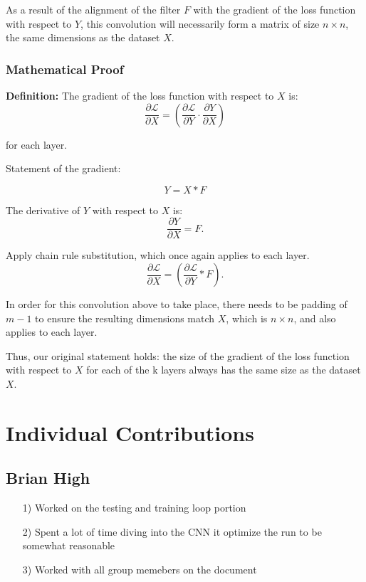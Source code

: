 \documentclass{article}
\begin{document}
As a result of the alignment of the filter \( F \) with the gradient of the loss function with respect to \( Y \), this convolution will necessarily form a matrix of size \( n \times n \), the same dimensions as the dataset \( X \).

\subsubsection*{Mathematical Proof}

\textbf{Definition:} The gradient of the loss function with respect to \( X \) is:
\[
\frac{\partial \mathcal{L}}{\partial X} = \left( \frac{\partial \mathcal{L}}{\partial Y} \cdot \frac{\partial Y}{\partial X} \right)
\]

for each layer.

Statement of the gradient:

\[
Y = X \ast F
\]

The derivative of \( Y \) with respect to \( X \) is:
\[
\frac{\partial Y}{\partial X} = F.
\]

Apply chain rule substitution, which once again applies to each layer.
\[
\frac{\partial \mathcal{L}}{\partial X} = \left( \frac{\partial \mathcal{L}}{\partial Y} \ast F \right).
\]

In order for this convolution above to take place, there needs to be padding of \( m - 1 \) to ensure the resulting dimensions match \( X \), which is \( n \times n \), and also applies to each layer.

Thus, our original statement holds: the size of the gradient of the loss function with respect to \( X \) for each of the k layers always has the same size as the dataset \( X \).

\section{Individual Contributions}

\subsection{Brian High}
\begin{itemize}
    \item[1)] Worked on the testing and training loop portion 
    \item[2)] Spent a lot of time diving into the CNN it optimize the run to be somewhat reasonable 
    \item[3)] Worked with all group memebers on the document
\end{itemize}
\end{document}
